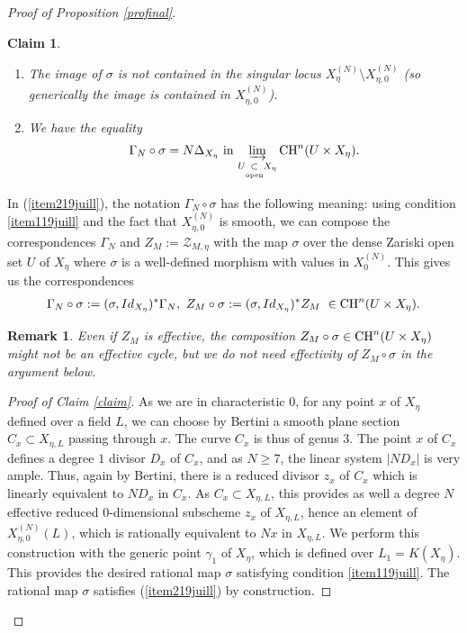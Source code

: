 \documentclass[10pt]{article}
\newtheorem{claim}[theo]{Claim}
\newtheorem{rema}[theo]{Remark}
\begin{document}
\begin{proof}[Proof of Proposition \ref{profinal}]
\begin{claim}
\begin{enumerate}
\item \label{item119juill} The image of $\sigma$ is not contained in the singular locus $X_{\eta}^{(N)}\setminus  X_{\eta,0}^{(N)}$ (so generically the image is contained in $X_{\eta,0}^{(N)}$).
    \item   We have the equality  \begin{eqnarray}\label{item219juill}\Gamma_N\circ \sigma= N\Delta_{X_\eta}\,\,{\rm in} \,\,\underset{{U}\underset{{\rm open}}{\subset} X_{\eta}}{\underrightarrow{\rm lim}}\,{\rm CH}^n(U\times X_\eta).
        \end{eqnarray}
        \end{enumerate}
\end{claim}
In (\ref{item219juill}), the notation $\Gamma_N\circ \sigma$ has the following meaning: using condition \ref{item119juill} and the fact that $X_{\eta,0}^{(N)}$ is smooth,  we can compose  the correspondences  $\Gamma_N$  and $Z_M:=\mathcal{Z}_{M,\eta}$ with  the  map $\sigma$   over the dense  Zariski open set $U$ of $X_\eta$ where $\sigma$ is  a well-defined morphism with  values in $X^{(N)}_0$. This gives us the  correspondences
 \begin{eqnarray} \label{eqtrucdu26juill}\Gamma_N\circ \sigma:=(\sigma,Id_{X_\eta})^*\Gamma_N,\,\,{Z}_{M}\circ \sigma:=(\sigma,Id_{X_\eta})^*{Z}_{M}\,\,\in{\rm CH}^n(U\times X_\eta).\end{eqnarray}
 \begin{rema}{\rm  Even if ${Z}_{M}$ is effective, the composition ${Z}_{M}\circ \sigma \in{\rm CH}^n(U\times X_\eta)$ might not be an effective cycle, but we do not need  effectivity of ${Z}_{M}\circ \sigma$  in the argument below.}
 \end{rema}
\begin{proof}[Proof of Claim \ref{claim}]
As we are in characteristic $0$, for any point $x$ of $X_\eta$ defined over a field $L$, we can choose by Bertini a smooth  plane section $C_x\subset X_{\eta,L}$ passing through $x$. The curve $C_x$ is thus of genus $3$. The point $x$ of $C_x$ defines a degree $1$ divisor  $D_x$ of $C_x$, and as $N\geq 7$, the linear system $|N D_x|$ is very ample. Thus, again by Bertini, there is a reduced  divisor $z_x$ of $C_x$ which is linearly equivalent to $ND_x$ in $C_x$. As $C_x\subset X_{\eta,L}$, this provides as well a degree $N$ effective reduced $0$-dimensional subscheme $z_x$ of $X_{\eta,L}$, hence an element of $X^{(N)}_{\eta,0}(L)$, which is rationally equivalent to $Nx$ in $X_{\eta,L}$.  We perform this construction with the generic point $\gamma_1$ of $X_\eta$, which is defined over $L_1=K(X_\eta)$. This provides the desired rational map $\sigma$ satisfying condition \ref{item119juill}. The rational map  $\sigma$ satisfies   (\ref{item219juill}) by construction.
\end{proof}


\end{proof}
\end{document}
